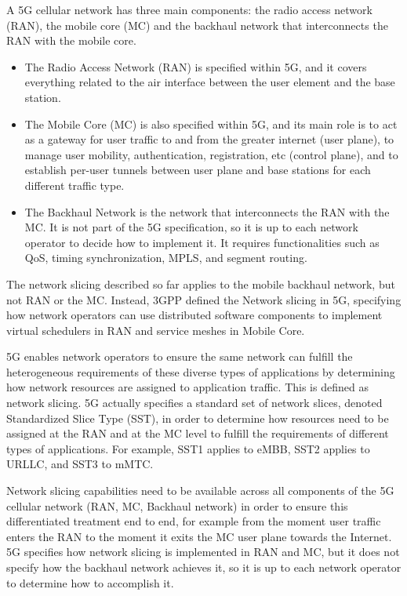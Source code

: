 \documentclass[journal,article,submit,moreauthors,pdftex]{Definitions/mdpi}
\begin{document}
A 5G cellular network has three main components: the radio access network (RAN), the mobile core (MC) and the backhaul network that interconnects the RAN with the mobile core. 

\begin{itemize}
\item  The Radio Access Network (RAN)  is specified within 5G, and it covers everything related to the air interface between the user element and the base station.

\item  The Mobile Core (MC) is also specified within 5G, and its main role is to act as a gateway for user traffic to and from the greater internet (user plane), to manage user mobility, authentication, registration, etc (control plane), and to establish per-user tunnels between user plane and base stations for each different traffic type.


\item The Backhaul Network is the network that interconnects the RAN with the MC. It is not part of the 5G specification, so it is up to each network operator to decide how to implement it. It requires functionalities such as QoS, timing synchronization, MPLS, and segment routing.
\end{itemize}

The network slicing described so far applies to the mobile backhaul network, but not RAN or the MC. Instead, 3GPP defined the Network slicing in 5G, specifying how network operators can use distributed software components to implement virtual schedulers in RAN and service meshes in Mobile Core.

5G enables network operators to ensure the same network can fulfill the heterogeneous requirements of these diverse types of applications by determining how network resources are assigned to application traffic. This is defined as network slicing. 5G actually specifies a standard set of network slices, denoted Standardized Slice Type (SST), in order to determine how resources need to be assigned at the RAN and at the MC level to fulfill the requirements of different types of applications. For example, SST1 applies to eMBB, SST2 applies to URLLC, and SST3 to mMTC.

Network slicing capabilities need to be available across all components of the 5G cellular network (RAN, MC, Backhaul network) in order to ensure this differentiated treatment end to end, for example from the moment user traffic enters the RAN to the moment it exits the MC user plane towards the Internet. 5G specifies how network slicing is implemented in RAN and MC, but it does not specify how the backhaul network achieves it, so it is up to each network operator to determine how to accomplish it.
\end{document}
